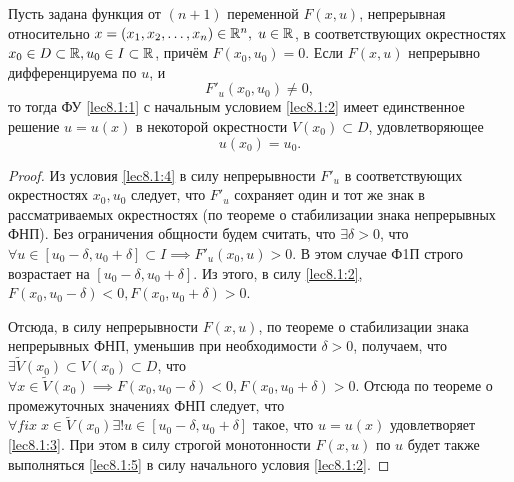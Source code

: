 \documentclass[../../main.tex]{subfiles}
\begin{document}
	 \begin{thm}
		Пусть задана функция от $(n+1)$ переменной $F(x, u)$, непрерывная 
		относительно $x = (x_1, x_2, \ldots,
	 	x_n) \in \mathbb{R}^n, \; u \in \mathbb{R}$, в соответствующих окрестностях $x_0 \in D 
	 	\subset \mathbb{R}, u_0 \in I \subset \mathbb{R}$, причём $F(x_0,u_0)=0$. Если $F(x,u)$ 
	 	непрерывно дифференцируема по $u$, и 
		\begin{equation}
			F'_u(x_0, u_0) \ne 0, \label{lec8.1:4}
		\end{equation}
		то тогда ФУ \eqref{lec8.1:1} с начальным условием \eqref{lec8.1:2} имеет 
		единственное решение $u = u(x)$ в некоторой окрестности $V(x_0) 
		\subset D$, удовлетворяющее
	 	\begin{equation}
			u(x_0) = u_0. \label{lec8.1:5}
		\end{equation}
	 \end{thm}
	 \begin{proof}
		 Из условия \eqref{lec8.1:4} в силу непрерывности $F'_u$ в 
		 соответствующих окрестностях $x_0, u_0$ следует, что $F'_u$ сохраняет 
		 один и тот же знак в рассматриваемых окрестностях (по теореме о 
		 стабилизации знака непрерывных ФНП). Без ограничения общности 
		 будем считать, что $\exists \delta > 0$, что $\forall u \in [u_0 - \delta, 
		 u_0 + \delta] \subset I \implies F'_u(x_0, u)>0$. В этом случае Ф1П
		 строго возрастает на $[u_0 - \delta, u_0 + \delta]$. Из этого, в силу 
		 \eqref{lec8.1:2}, $F(x_0, u_0 - \delta) < 0, F(x_0, u_0 + \delta) > 0$.

		 Отсюда, в силу непрерывности
		 $F(x,u)$, по теореме о стабилизации  знака непрерывных ФНП, 
		 уменьшив при необходимости
		 $\delta > 0$, получаем, что $\exists \widetilde V(x_0) \subset V(x_0) 
		 \subset D$, что $\forall x \in \widetilde V(x_0) \implies F(x_0, u_0 - 
		 \delta) < 0, F(x_0, u_0 + \delta) > 0$. Отсюда по теореме о промежуточных 
		 значениях ФНП следует, что $\forall fix \; x \in \widetilde V(x_0) \exists! 
		 u \in [u_0 - \delta, u_0 + \delta]$ такое, что $u = u(x)$ удовлетворяет 
		 \eqref{lec8.1:3}. При этом в силу строгой монотонности $F(x, u)$ по $u$ 
		 будет также выполняться \eqref{lec8.1:5} в силу начального условия 
		 \eqref{lec8.1:2}. 
	 \end{proof}
\end{document}
